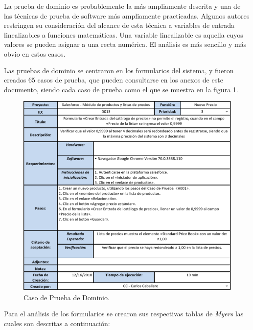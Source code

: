 La prueba de dominio es probablemente la más ampliamente descrita y una de las
técnicas de prueba de software más ampliamente practicadas. Algunos autores
restringen su consideración del alcance de esta técnica a variables de entrada
linealizables a funciones matemáticas. Una variable linealizable es aquella
cuyos valores se pueden asignar a una recta numérica. El análisis es más
sencillo y más obvio en estos casos\cite{Kaner}.

Las pruebas de dominio se centraron en los formularios del sistema, y fueron
creados 65 casos de prueba, que pueden consultarse en los anexos de este
documento, siendo cada caso de prueba como el que se muestra en la figura
\ref{tc_domain}.

\begin{figure}
\centering
\includegraphics[width=1.0\textwidth]{graphics/tc3-domain.eps}
\caption{Caso de Prueba de Dominio.}
\label{tc_domain}
\end{figure}

Para el análisis de los formularios se crearon sus respectivas tablas de
\emph{Myers} las cuales son descritas a continuación:

